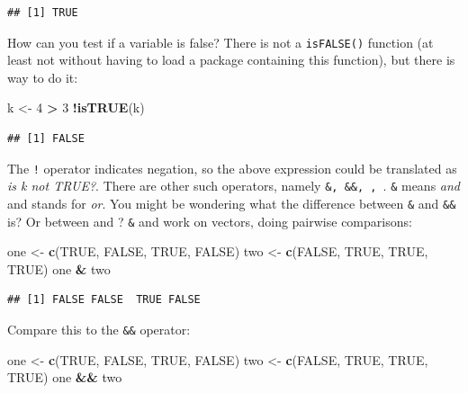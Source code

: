 \documentclass[]{gitbook}
\newenvironment{Shaded}{\begin{snugshade}}{\end{snugshade}}
\newcommand{\DecValTok}[1]{\textcolor[rgb]{0.00,0.00,0.81}{#1}}
\newcommand{\KeywordTok}[1]{\textcolor[rgb]{0.13,0.29,0.53}{\textbf{#1}}}
\newcommand{\NormalTok}[1]{#1}
\newcommand{\OperatorTok}[1]{\textcolor[rgb]{0.81,0.36,0.00}{\textbf{#1}}}
\newcommand{\OtherTok}[1]{\textcolor[rgb]{0.56,0.35,0.01}{#1}}
\newcommand{\StringTok}[1]{\textcolor[rgb]{0.31,0.60,0.02}{#1}}
\begin{document}
\begin{verbatim}
## [1] TRUE
\end{verbatim}

How can you test if a variable is false? There is not a \texttt{isFALSE()} function (at least not without having
to load a package containing this function), but there is way to do it:

\begin{Shaded}
\begin{Highlighting}[]
\NormalTok{k <-}\StringTok{ }\DecValTok{4} \OperatorTok{>}\StringTok{ }\DecValTok{3}
\OperatorTok{!}\KeywordTok{isTRUE}\NormalTok{(k)}
\end{Highlighting}
\end{Shaded}

\begin{verbatim}
## [1] FALSE
\end{verbatim}

The \texttt{!} operator indicates negation, so the above expression could be translated as \emph{is k not TRUE?}.
There are other such operators, namely \texttt{\&,\ \&\&,\ \textbar{},\ \textbar{}\textbar{}}. \texttt{\&} means \emph{and} and \texttt{\textbar{}} stands for \emph{or}.
You might be wondering what the difference between \texttt{\&} and \texttt{\&\&} is? Or between \texttt{\textbar{}} and \texttt{\textbar{}\textbar{}}? \texttt{\&} and
\texttt{\textbar{}} work on vectors, doing pairwise comparisons:

\begin{Shaded}
\begin{Highlighting}[]
\NormalTok{one <-}\StringTok{ }\KeywordTok{c}\NormalTok{(}\OtherTok{TRUE}\NormalTok{, }\OtherTok{FALSE}\NormalTok{, }\OtherTok{TRUE}\NormalTok{, }\OtherTok{FALSE}\NormalTok{)}
\NormalTok{two <-}\StringTok{ }\KeywordTok{c}\NormalTok{(}\OtherTok{FALSE}\NormalTok{, }\OtherTok{TRUE}\NormalTok{, }\OtherTok{TRUE}\NormalTok{, }\OtherTok{TRUE}\NormalTok{)}
\NormalTok{one }\OperatorTok{&}\StringTok{ }\NormalTok{two}
\end{Highlighting}
\end{Shaded}

\begin{verbatim}
## [1] FALSE FALSE  TRUE FALSE
\end{verbatim}

Compare this to the \texttt{\&\&} operator:

\begin{Shaded}
\begin{Highlighting}[]
\NormalTok{one <-}\StringTok{ }\KeywordTok{c}\NormalTok{(}\OtherTok{TRUE}\NormalTok{, }\OtherTok{FALSE}\NormalTok{, }\OtherTok{TRUE}\NormalTok{, }\OtherTok{FALSE}\NormalTok{)}
\NormalTok{two <-}\StringTok{ }\KeywordTok{c}\NormalTok{(}\OtherTok{FALSE}\NormalTok{, }\OtherTok{TRUE}\NormalTok{, }\OtherTok{TRUE}\NormalTok{, }\OtherTok{TRUE}\NormalTok{)}
\NormalTok{one }\OperatorTok{&&}\StringTok{ }\NormalTok{two}
\end{Highlighting}
\end{Shaded}
\end{document}
